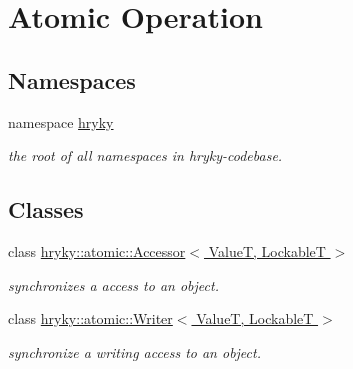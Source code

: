 \hypertarget{group__atomic__operation}{\section{Atomic Operation}
\label{group__atomic__operation}
}
\subsection*{Namespaces}
\begin{DoxyCompactItemize}
\item 
namespace \hyperlink{namespacehryky}{hryky}
\begin{DoxyCompactList}\small\item\em the root of all namespaces in hryky-\/codebase. \end{DoxyCompactList}\end{DoxyCompactItemize}
\subsection*{Classes}
\begin{DoxyCompactItemize}
\item 
class \hyperlink{classhryky_1_1atomic_1_1_accessor}{hryky\-::atomic\-::\-Accessor$<$ Value\-T, Lockable\-T $>$}
\begin{DoxyCompactList}\small\item\em synchronizes a access to an object. \end{DoxyCompactList}\item 
class \hyperlink{classhryky_1_1atomic_1_1_writer}{hryky\-::atomic\-::\-Writer$<$ Value\-T, Lockable\-T $>$}
\begin{DoxyCompactList}\small\item\em synchronize a writing access to an object. \end{DoxyCompactList}\end{DoxyCompactItemize}
